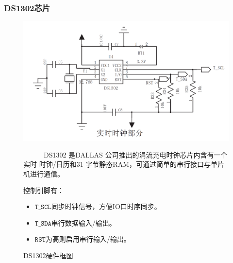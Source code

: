 \documentclass{article}
\begin{document}
\subsubsection{DS1302芯片}
\begin{figure}[H]
    \begin{minipage}{0.49\textwidth}
        \centering
        \includegraphics[width=0.99\linewidth]{assets/5.png}
        \caption{DS1302硬件框图}
    \end{minipage}
    \begin{minipage}{0.5\textwidth}
    \ \ \ \ \ \ DS1302 是DALLAS 公司推出的涓流充电时钟芯片内含有一个实时
    时钟/日历和31 字节静态RAM，可通过简单的串行接口与单片机进行通信。\par
    控制引脚有：
    \begin{itemize}
        \item $\texttt{T\_SCL}$同步时钟信号，方便IO口时序同步。
        \item $\texttt{T\_SDA}$串行数据输入/输出。
        \item $\texttt{RST}$为高则启用串行输入/输出。
    \end{itemize}
    \end{minipage}
\end{figure}
\end{document}
